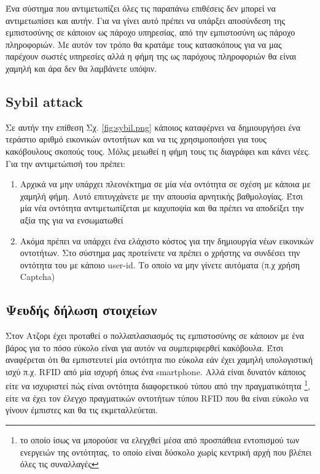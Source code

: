 Ένα σύστημα που αντιμετωπίζει όλες τις παραπάνω επιθέσεις δεν μπορεί να αντιμετωπίσει και αυτήν. Για να γίνει αυτό πρέπει να υπάρξει αποσύνδεση της εμπιστοσύνης σε κάποιον ως πάροχο υπηρεσίας, από την εμπιστοσύνη ως πάροχο πληροφοριών. Με αυτόν τον τρόπο θα κρατάμε τους κατασκόπους για να μας παρέχουν σωστές υπηρεσίες αλλά η φήμη της ως παρόχους πληροφοριών θα είναι χαμηλή και άρα δεν θα λαμβάνετε υπόψιν.


\newpage 

\subsection{Sybil attack}\label{sec:sybil}

Σε αυτήν την επίθεση  Σχ. \ref{fig:sybil.png} κάποιος καταφέρνει να δημιουργήσει ένα τεράστιο αριθμό εικονικών οντοτήτων και να τις χρησιμοποιήσει για τους κακόβουλους σκοπούς τους. Μόλις μειωθεί η φήμη τους τις διαγράφει και κάνει νέες. Για την αντιμετώπισή του πρέπει: \begin{enumerate}

\item Αρχικά να μην υπάρχει πλεονέκτημα σε μία νέα οντότητα σε σχέση με κάποια με χαμηλή φήμη. Αυτό επιτυγχάνετε με την απουσία αρνητικής βαθμολογίας. Έτσι μία νέα οντότητα αντιμετωπίζεται με καχυποψία και θα πρέπει να αποδείξει την αξία της για να ενσωματωθεί

\item Ακόμα πρέπει να υπάρχει ένα ελάχιστο κόστος για την δημιουργία νέων εικονικών οντοτήτων. Στο σύστημα μας προτείνετε να πρέπει ο χρήστης να συνδέσει την οντότητα του με κάποιο user-id. Το οποίο να μην γίνετε αυτόματα (π.χ χρήση Captcha)

\end{enumerate}


\subsection{Ψευδής δήλωση στοιχείων}

Στον Ατζορι έχει προταθεί ο πολλαπλασιασμός τις εμπιστοσύνης σε κάποιον με ένα βάρος για το πόσο εύκολο είναι για αυτόν να συμπεριφερθεί κακόβουλα. Έτσι αναφέρεται ότι θα εμπιστευτεί μία οντότητα πιο εύκολα εάν έχει χαμηλή υπολογιστική ισχύ π.χ. RFID  από μία ισχυρή όπως ένα smartphone. Αλλά είναι δυνατόν κάποιος είτε να ισχυριστεί πώς είναι οντότητα διαφορετικού τύπου από την πραγματικότητα \footnote{ το οποίο ίσως να μπορούσε να ελεγχθεί μέσα από προσπάθεια εντοπισμού των ενεργειών της οντότητας, το οποίο είναι δύσκολο χωρίς κεντρική αρχή που βλέπει όλες τις συναλλαγές}, είτε να έχει τον έλεγχο πραγματικών οντοτήτων τύπου RFID που θα είναι εύκολο να γίνουν έμπιστες και θα τις εκμεταλλεύεται. 

